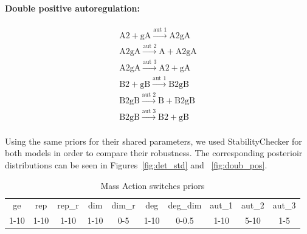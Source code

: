 \paragraph{Double positive autoregulation:}
$$
\begin{array}{cccc} 
    \textrm{A2} + \textrm{gA} \stackrel{\textrm{aut 1}}{\longrightarrow} \textrm{A2gA} \\
    \textrm{A2gA} \stackrel{\textrm{aut 2}}{\longrightarrow} \textrm{A} + \textrm{A2gA}\\
    \textrm{A2gA} \stackrel{\textrm{aut 3}}{\longrightarrow} \textrm{A2}+ \textrm{gA}  \\
    \textrm{B2} + \textrm{gB} \stackrel{\textrm{aut 1}}{\longrightarrow} \textrm{B2gB} \\
    \textrm{B2gB} \stackrel{\textrm{aut 2}}{\longrightarrow} \textrm{B} + \textrm{B2gB}\\
    \textrm{B2gB} \stackrel{\textrm{aut 3}}{\longrightarrow} \textrm{B2}+ \textrm{gB}  \\
\end{array}
$$

Using the same priors for their shared parameters, we used StabilityChecker for both models in order to compare their robustness. The corresponding posterioir distributions can be seen in Figures~\ref{fig:det_std} and ~\ref{fig:doub_pos}.

\clearpage
\begin{table}[p]
\centering
\caption{Mass Action switches priors}
\label{tab:simp}
\begin{tabular}{cccccccccc}
ge   & rep  & rep\_r & dim  & dim\_r & deg & deg\_dim & aut\_1 & aut\_2 & aut\_3\\
1-10 & 1-10 & 1-10    & 1-10 & 0-5    & 1-10 & 0-0.5   &1-10&5-10&1-5
\end{tabular}
\end{table}


